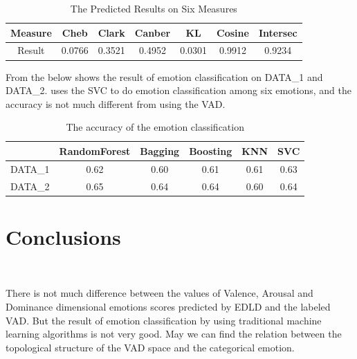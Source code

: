 \begin{table} [htbp] \centering
	\caption{The Predicted Results on Six Measures}
	\label{tbl:predictedresult}
	\begin{tabular}{ccccccc}
		\toprule
		Measure & Cheb  & Clark & Canber & KL & Cosine & Intersec\\
		\midrule
		Result &  0.0766 &  0.3521 &  0.4952 & 0.0301 & 0.9912 &0.9234\\
		\bottomrule
	\end{tabular}
\end{table}
 

From the  below
shows the result of emotion classification
on DATA\_1 and DATA\_2.
\cite{Aman2007}
uses the SVC to do emotion classification
among six emotions,
and the accuracy is not much different from
using the VAD.

\begin{table} [htbp] \centering
  \caption{The accuracy of the emotion classification}
  \label{tbl:overall-experiments}
\begin{tabular}{cccccc}
\toprule
 & RandomForest  & Bagging & Boosting & KNN & SVC\\
\midrule
DATA\_1&  0.62 &  0.60 &  0.61 & 0.61 & 0.63\\
DATA\_2 &  0.65 &  0.64 &  0.64 & 0.60 & 0.64\\
\bottomrule
\end{tabular}
\end{table}




\section{Conclusions} \label{sec-conclusions}
\
	
	There is not much difference between 
	the values of Valence, Arousal and Dominance 
	dimensional emotions scores predicted by EDLD
	and the labeled VAD.
	But the result of
	emotion classification
	by using traditional machine learning algorithms
	is not very good.
	May we can find the relation between 
	the topological structure of the
    VAD space and the categorical emotion.
	
